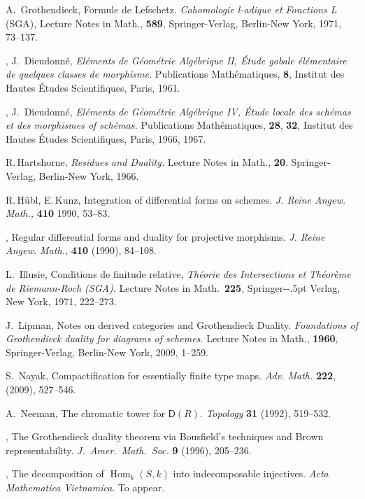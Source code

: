 \documentclass{compositio}
\theoremstyle{plain}
\theoremstyle{definition}
\theoremstyle{remark}
\numberwithin{equation}{thm}
\begin{document}
\begin{thebibliography}{AILN10}
A.\ Grothendieck, Formule de Lefschetz. \textit{Cohomologie l-adique et Fonctions L}
(SGA),  
Lecture Notes in Math., {\bf 589}, Springer-Verlag, Berlin-New York, 1971, 73--137.

  \bysame,  J.\ Dieudonn\'{e},
{\it El\'{e}ments  de  G\'{e}om\'{e}trie Alg\'{e}brique II, \'{E}tude
gobale \'el\'ementaire de quelques classes de morphisme.}
Publications Math\'{e}matiques, {\bf 8}, Institut\- des Hautes \'{E}tudes  Scientifiques, Paris, 1961.

  \bysame,  J.\ Dieudonn\'{e},
{\it El\'{e}ments  de  G\'{e}om\'{e}trie Alg\'{e}brique IV, \'{E}tude
locale des  sch\'{e}mas et des morphismes of  sch\'{e}mas.}
Publications Math\'{e}matiques, {\bf 28}, {\bf 32},
Institut\- des Hautes \'{E}tudes  Scientifiques, Paris, 1966, 1967.

 R.\,Hartshorne,  \textit{Residues and Duality.} Lecture
Notes in Math., \textbf{20}. Springer-Verlag, Berlin-New York, 1966.

 R.\,H\"ubl, E.\,Kunz, Integration of differential forms on schemes.
\textit{J. Reine Angew. Math.,} {\bf 410} {1990}, 53--83.

 \bysame, Regular differential forms and duality for projective morphisms. 
\textit{J. Reine Angew. Math.,} {\bf 410} (1990), 84--108.

 L.\ Illusie, Conditions de finitude relative,
\textit{Th\'eorie des Intersections et Th\'eor\`eme de Riemann-Roch (SGA).}
Lecture Notes in Math.\ \textbf{225},
Springer-\kern-.5pt Verlag, New York, 1971, 222--273.

 J.\ Lipman, Notes on derived categories and Grothendieck Duality. \textit{Foundations of Grothendieck duality for diagrams of schemes.}  Lecture Notes in Math., {\bf 1960}, Springer-Verlag, Berlin-New York, 2009, 1--259.

 S.\ Nayak, Compactification for essentially finite type maps. \textit{Adv. Math.} 
{\bf222}, (2009), 527--546.

  A.\ Neeman, The chromatic tower for ${\boldsymbol{\mathsf{D}}}(R)$.
\textit{Topology} {\bf31} (1992), 519--532.

  \bysame,  The Grothendieck duality theorem via Bousfield's techniques and Brown representability. \textit{J.\ Amer.\ Math.\ Soc.} {\bf9} (1996),  205--236.

  \bysame, The decomposition of $\operatorname{Hom}_k^{}(S,k)$ into indecomposable injectives. \textit{Acta Mathematica Vietnamica}. To appear.


\end{thebibliography}
\end{document}

